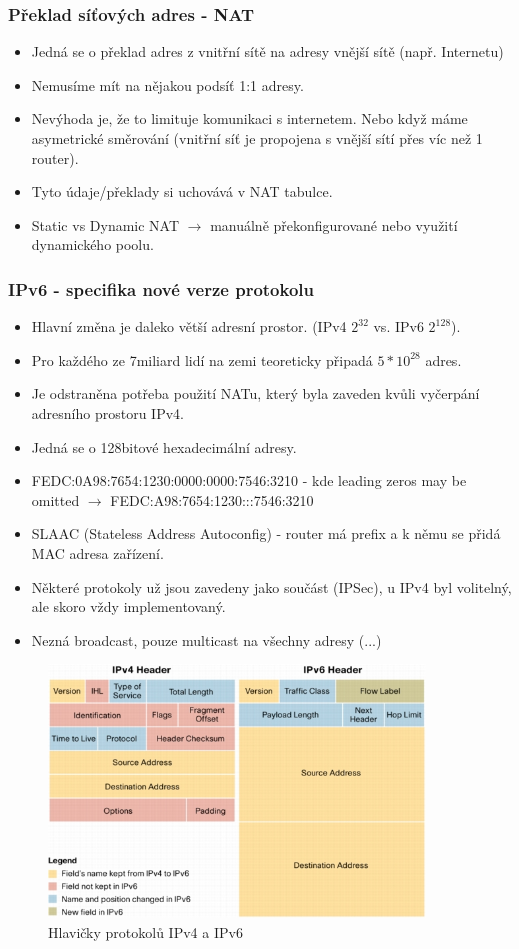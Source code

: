\documentclass[10pt,a4paper]{article}
\begin{document}
\subsubsection{Překlad síťových adres - NAT}
\begin{itemize}
\item Jedná se o překlad adres z vnitřní sítě na adresy vnější sítě (např. Internetu)
\item Nemusíme mít na nějakou podsíť 1:1 adresy.
\item Nevýhoda je, že to limituje komunikaci s internetem. Nebo když máme asymetrické směrování (vnitřní síť je propojena s vnější sítí přes víc než 1 router).
\item Tyto údaje/překlady si uchovává v NAT tabulce.
\item Static vs Dynamic NAT $\rightarrow$ manuálně překonfigurované nebo využití dynamického poolu.
\end{itemize}

\subsubsection{IPv6 - specifika nové verze protokolu}
\begin{itemize}
\item Hlavní změna je daleko větší adresní prostor. (IPv4 $2^{32}$ vs. IPv6 $2^{128}$).
\item Pro každého ze 7miliard lidí na zemi teoreticky připadá $5*10^{28}$ adres.
\item Je odstraněna potřeba použití NATu, který byla zaveden kvůli vyčerpání adresního prostoru IPv4.
\item Jedná se o 128bitové hexadecimální adresy.
\item FEDC:0A98:7654:1230:0000:0000:7546:3210 - kde leading zeros may be omitted $\rightarrow$ FEDC:A98:7654:1230:::7546:3210
\item SLAAC (Stateless Address Autoconfig) - router má prefix a k němu se přidá MAC adresa zařízení.
\item Některé protokoly už jsou zavedeny jako součást (IPSec), u IPv4 byl volitelný, ale skoro vždy implementovaný.
\item Nezná broadcast, pouze multicast na všechny adresy (...)
\end{itemize}
\begin{figure}[ht]
    \centering
    \includegraphics[width=10cm]{ipv6.jpg}
    \caption{Hlavičky protokolů IPv4 a IPv6}
    \label{fig:ipHeaders}
\end{figure}
\end{document}
